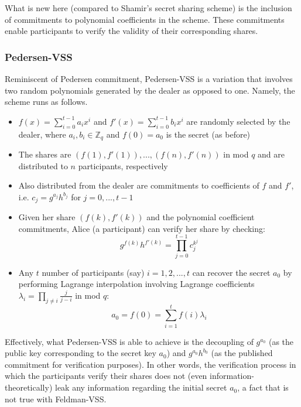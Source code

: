 \documentclass[11pt]{article}
\theoremstyle{definition}
\theoremstyle{remark}
\begin{document}
What is new here (compared to Shamir's secret sharing scheme) is the inclusion of commitments to polynomial coefficients in the scheme. These commitments enable participants to verify the validity of their corresponding shares.

\subsubsection{Pedersen-VSS}
Reminiscent of Pedersen commitment, Pedersen-VSS is a variation that involves two random polynomials generated by the dealer as opposed to one. Namely, the scheme runs as follows.

\begin{itemize}
\item $f(x) = \sum_{i = 0}^{t - 1} a_i x^i$ and $f'(x) = \sum_{i = 0}^{t - 1} b_i x^i$ are randomly selected by the dealer, where $a_i, b_i \in \mathbb{Z}_q$ and $f(0) = a_0$ is the secret (as before)
\item The shares are $(f(1), f'(1)), ..., (f(n), f'(n))$ in mod $q$ and are distributed to $n$ participants, respectively
\item Also distributed from the dealer are commitments to coefficients of $f$ and $f'$, i.e. $c_j = g^{a_j} h^{b_j}$ for $j = 0, ..., t - 1$
\item Given her share $(f(k), f'(k))$ and the polynomial coefficient commitments, Alice (a participant) can verify her share by checking:
$$g^{f(k)} h^{f'(k)} = \prod_{j = 0}^{t - 1} c_j^{k^j}$$
\item Any $t$ number of participants (say) $i = 1, 2, ..., t$ can recover the secret $a_0$ by performing Lagrange interpolation involving Lagrange coefficients $\lambda_i = \prod_{j \neq i} \frac{j}{j - i}$ in mod $q$:
$$a_0 = f(0) = \sum_{i = 1}^{t} f(i) \lambda_i$$
\end{itemize}

Effectively, what Pedersen-VSS is able to achieve is the decoupling of $g^{a_0}$ (as the public key corresponding to the secret key $a_0$) and $g^{a_0} h^{b_0}$ (as the published commitment for verification purposes). In other words, the verification process in which the participants verify their shares does not (even information-theoretically) leak any information regarding the initial secret $a_0$, a fact that is not true with Feldman-VSS.


\end{document}
